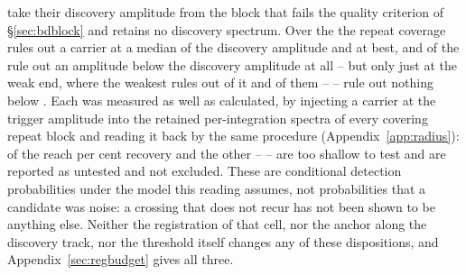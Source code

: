 \RcNWithheld{} take their discovery amplitude from the block that fails the
quality criterion of \S\ref{sec:bdblock} and \RcNNoSpec{} retains no discovery
spectrum. Over the \RcNExcl{} the repeat coverage rules out a carrier at a
median \RcFracMed{} of the discovery amplitude and \RcFracMin{} at best, and
\RcNFracBelow{} of the \RcNExcl{} rule out an amplitude below the discovery
amplitude at all -- but only just at the weak end, where the weakest rules out
\RcFracMax{} of it and \RcNFracWeak{} of them -- \RcFracWeakList{} -- rule out
nothing below \RcFracWeakLo. Each was measured as well as calculated, by
injecting a carrier at the trigger amplitude into the retained
per-integration spectra of every covering repeat block and reading it back by
the same procedure (Appendix~\ref{app:radius}):
\HjNPowerHi{} of the \RcNExcl{} reach \RcPowerLevel{} per cent recovery and
the other \HjNPowerLo{} -- \HjLowList{} -- are too shallow to test and are
reported as untested and not excluded. These are conditional detection
probabilities under the model this reading assumes, not probabilities that a
candidate was noise: a crossing that does not recur has not been shown to be
anything else. Neither the registration of that cell, nor the anchor along the
discovery track, nor the threshold itself changes any of these dispositions,
and Appendix~\ref{sec:regbudget} gives all three.

